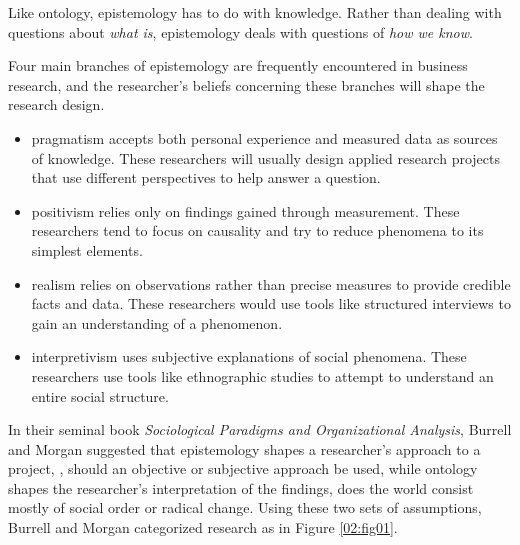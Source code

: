 Like ontology, epistemology has to do with knowledge. Rather than dealing with questions about \textit{what is}, epistemology deals with questions of \textit{how we know}. 

Four main branches of epistemology are frequently encountered in business research, and the researcher's beliefs concerning these branches will shape the research design.

\begin{itemize}
	\item \Gls{pragmatism} accepts both personal experience and measured data as sources of knowledge. These researchers will usually design applied research projects that use different perspectives to help answer a question.

	\item \Gls{positivism} relies only on findings gained through measurement. These researchers tend to focus on causality and try to reduce phenomena to its simplest elements.

	\item \Gls{realism} relies on observations rather than precise measures to provide credible facts and data. These researchers would use tools like structured interviews to gain an understanding of a phenomenon.

	\item \Gls{interpretivism} uses subjective explanations of social phenomena. These researchers use tools like ethnographic studies to attempt to understand an entire social structure.
\end{itemize}

In their seminal book \textit{Sociological Paradigms and Organizational Analysis}\cite{burrell2017sociological}, Burrell and Morgan suggested that epistemology shapes a researcher's approach to a project, \eg, should an objective or subjective approach be used, while ontology shapes the researcher's interpretation of the findings, \eg does the world consist mostly of social order or radical change. Using these two sets of assumptions, Burrell and Morgan categorized research as in Figure \ref{02:fig01}.

